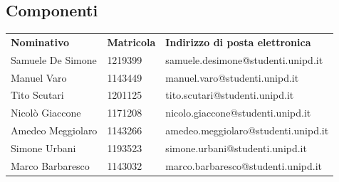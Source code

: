     \subsection{Componenti}
        \begin{center}
            \begin{table}[h!]
                \centering
                \renewcommand{\arraystretch}{1.8}
                \begin{tabular}{p{150px} p{50px} p{170px}}
                    \rowcolor{logo!70} \textbf{Nominativo} & \textbf{Matricola} & \textbf{Indirizzo di posta elettronica}\\
                    Samuele De Simone & 1219399 & samuele.desimone@studenti.unipd.it \\
                    Manuel Varo & 1143449 & manuel.varo@studenti.unipd.it \\
                    Tito Scutari & 1201125 & tito.scutari@studenti.unipd.it \\
                    Nicolò Giaccone & 1171208 & nicolo.giaccone@studenti.unipd.it \\
                    Amedeo Meggiolaro & 1143266 & amedeo.meggiolaro@studenti.unipd.it \\
                    Simone Urbani & 1193523 & simone.urbani@studenti.unipd.it \\
                    Marco Barbaresco & 1143032 & marco.barbaresco@studenti.unipd.it \\
                \end{tabular}
            \end{table}
        \end{center}